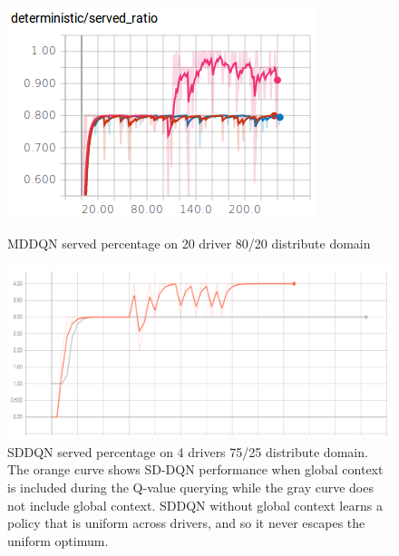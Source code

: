 \begin{figure}[H]
\begin{floatrow}
\centering
\includegraphics[width=1.0\linewidth]{sections/mddqn/figures/MDDQN_imbal2.png}\label{fig:imbalancedMD}

\caption{MDDQN served percentage on 20 driver 80/20 distribute domain}
\end{floatrow}
\end{figure}

\begin{figure}[H]
\begin{floatrow}
\centering
\includegraphics[width=1.0\linewidth]{sections/mddqn/figures/SDDQN_imbal4d.png}
\caption{SDDQN served percentage on 4 drivers 75/25 distribute domain. The orange curve shows SD-DQN performance when global context is included during the Q-value querying while the gray curve does not include global context. SDDQN without global context learns a policy that is uniform across drivers, and so it never escapes the uniform optimum.}
\label{fig:gs}
\end{floatrow}
\end{figure}






